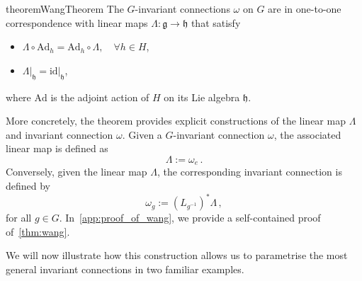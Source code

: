 \documentclass[12pt,a4paper]{article}
\numberwithin{equation}{section}
\theoremstyle{plain}
\theoremstyle{definition}
\theoremstyle{remark}
\begin{document}
\begin{restatable}{theorem}{WangTheorem}\label{thm:wang}
    The $G$-invariant connections $\omega$ on $G$ are in one-to-one correspondence with linear maps $\Lambda:\mathfrak{g} \to \mathfrak{h}$ that satisfy
    \begin{itemize}
        \item[(i)] $\Lambda \circ \mathrm{Ad}_h = \mathrm{Ad}_h \circ \Lambda, \quad \forall h \in H$,
        \item[(ii)] $\left.\Lambda\right|_{\mathfrak{h}} = \left.\mathrm{id}\right|_\mathfrak{h}$,
    \end{itemize}
    where $\mathrm{Ad}$ is the adjoint action of $H$ on its Lie algebra $\mathfrak{h}$.
\end{restatable}

More concretely, the theorem provides explicit constructions of the linear map $\Lambda$ and invariant connection $\omega$. Given a $G$-invariant connection $\omega$, the associated linear map is defined as
\begin{equation}
    \Lambda := \omega_{e}\,.
\end{equation}
Conversely, given the linear map $\Lambda$, the corresponding invariant connection is defined by
\begin{equation}
    \omega_g:=(L_{g^{-1}})^*\Lambda \,,
\end{equation}
for all $g\in G$. In~\cref{app:proof_of_wang}, we provide a self-contained proof of~\cref{thm:wang}.

We will now illustrate how this construction allows us to parametrise the most general invariant connections in two familiar examples.
\end{document}
